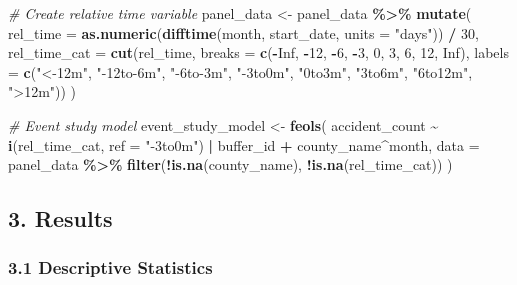 \documentclass[
]{article}
\newenvironment{Shaded}{\begin{snugshade}}{\end{snugshade}}
\newcommand{\AttributeTok}[1]{\textcolor[rgb]{0.13,0.29,0.53}{#1}}
\newcommand{\CommentTok}[1]{\textcolor[rgb]{0.56,0.35,0.01}{\textit{#1}}}
\newcommand{\ConstantTok}[1]{\textcolor[rgb]{0.56,0.35,0.01}{#1}}
\newcommand{\DecValTok}[1]{\textcolor[rgb]{0.00,0.00,0.81}{#1}}
\newcommand{\FunctionTok}[1]{\textcolor[rgb]{0.13,0.29,0.53}{\textbf{#1}}}
\newcommand{\NormalTok}[1]{#1}
\newcommand{\OtherTok}[1]{\textcolor[rgb]{0.56,0.35,0.01}{#1}}
\newcommand{\SpecialCharTok}[1]{\textcolor[rgb]{0.81,0.36,0.00}{\textbf{#1}}}
\newcommand{\StringTok}[1]{\textcolor[rgb]{0.31,0.60,0.02}{#1}}
\begin{document}
\begin{Shaded}
\begin{Highlighting}[]
\CommentTok{\# Create relative time variable}
\NormalTok{panel\_data }\OtherTok{\textless{}{-}}\NormalTok{ panel\_data }\SpecialCharTok{\%\textgreater{}\%}
  \FunctionTok{mutate}\NormalTok{(}
    \AttributeTok{rel\_time =} \FunctionTok{as.numeric}\NormalTok{(}\FunctionTok{difftime}\NormalTok{(month, start\_date, }\AttributeTok{units =} \StringTok{"days"}\NormalTok{)) }\SpecialCharTok{/} \DecValTok{30}\NormalTok{,}
    \AttributeTok{rel\_time\_cat =} \FunctionTok{cut}\NormalTok{(rel\_time, }
                       \AttributeTok{breaks =} \FunctionTok{c}\NormalTok{(}\SpecialCharTok{{-}}\ConstantTok{Inf}\NormalTok{, }\SpecialCharTok{{-}}\DecValTok{12}\NormalTok{, }\SpecialCharTok{{-}}\DecValTok{6}\NormalTok{, }\SpecialCharTok{{-}}\DecValTok{3}\NormalTok{, }\DecValTok{0}\NormalTok{, }\DecValTok{3}\NormalTok{, }\DecValTok{6}\NormalTok{, }\DecValTok{12}\NormalTok{, }\ConstantTok{Inf}\NormalTok{),}
                       \AttributeTok{labels =} \FunctionTok{c}\NormalTok{(}\StringTok{"\textless{}{-}12m"}\NormalTok{, }\StringTok{"{-}12to{-}6m"}\NormalTok{, }\StringTok{"{-}6to{-}3m"}\NormalTok{, }\StringTok{"{-}3to0m"}\NormalTok{, }
                                  \StringTok{"0to3m"}\NormalTok{, }\StringTok{"3to6m"}\NormalTok{, }\StringTok{"6to12m"}\NormalTok{, }\StringTok{"\textgreater{}12m"}\NormalTok{))}
\NormalTok{  )}

\CommentTok{\# Event study model}
\NormalTok{event\_study\_model }\OtherTok{\textless{}{-}} \FunctionTok{feols}\NormalTok{(}
\NormalTok{  accident\_count }\SpecialCharTok{\textasciitilde{}} \FunctionTok{i}\NormalTok{(rel\_time\_cat, }\AttributeTok{ref =} \StringTok{"{-}3to0m"}\NormalTok{) }\SpecialCharTok{|}\NormalTok{ buffer\_id }\SpecialCharTok{+}\NormalTok{ county\_name}\SpecialCharTok{\^{}}\NormalTok{month,}
  \AttributeTok{data =}\NormalTok{ panel\_data }\SpecialCharTok{\%\textgreater{}\%} \FunctionTok{filter}\NormalTok{(}\SpecialCharTok{!}\FunctionTok{is.na}\NormalTok{(county\_name), }\SpecialCharTok{!}\FunctionTok{is.na}\NormalTok{(rel\_time\_cat))}
\NormalTok{)}
\end{Highlighting}
\end{Shaded}

\subsection{3. Results}\label{results}

\subsubsection{3.1 Descriptive Statistics}\label{descriptive-statistics}
\end{document}

